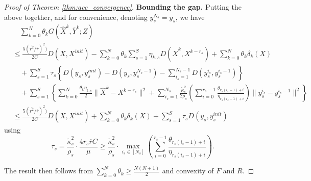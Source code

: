 \documentclass[10pt,a4paper]{amsart}
\begin{document}
\begin{proof}[Proof of Theorem \ref{thm:acc_convergence}]
\textbf{Bounding the gap.}
Putting the above together, and for convenience, denoting $y_s^{N_s} = y_s$, we have
\begin{align*}
    &\quad \sum_{k=0}^N \theta_kG(\widehat{X}^k,\overline{Y}^k;Z)\\
     &\leq \frac{5(\overline{r^2}/\overline{r})^2)}{2C}D(X,X^{init})-\sum_{k=0}^N\theta_k\sum_{s=1}^S  \eta_{k,s} D(\widehat{X}^k,X^{k-r_s})+\sum_{k=0}^N\theta_k\delta_k(X)\\
     &\quad + \sum_{s=1}^S\tau_s\left\{D(y_s,y_s^{init}) - D(y_s,y_s^{N_s-1})-\sum_{i_s=1}^{N_s-1} D(y^{i_s}_s,y_s^{i_s-1})\right\}\\
     &\quad + \sum_{s=1}^S \left\{\sum_{k=0}^N\frac{\theta_k\eta_{k,s}}{2}\|\widehat{X}^k - X^{k-r_s}\|^2 +\sum_{i_s=1}^{N_s}\frac{\widetilde{\kappa}_s^2}{2\rho_s}(\sum_{i=0}^{r_s-1}\frac{\theta_{r_s(i_s-1)+i}}{\eta_{r_s(i_s-1)+i}})\|y_s^{i_s} - y_s^{i_s-1}\|^2\right\}\\
    &\leq \frac{5(\overline{r^2}/\overline{r})^2)}{2C}D(X,X^{init})+\sum_{k=0}^N\theta_k\delta_k(X)+ \sum_{s=1}^S\tau_{s}D(y_s,y_s^{init}) 
\end{align*}
using 
\begin{displaymath}
    \tau_s = \frac{\widetilde{\kappa}_s^2}{\rho_s}\cdot\frac{4r_s\overline{r}C}{\mu}\geq \frac{\widetilde{\kappa}_s^2}{\rho_s}\cdot \max_{i_s\in [N_s]}(\sum_{i=0}^{r_s-1}\frac{\theta_{r_s(i_s-1)+i}}{\eta_{r_s(i_s-1)+i}}). 
\end{displaymath}

The result then follows from $\sum_{k=0}^N \theta_k\geq \frac{N(N+1)}{2}$ and convexity of $F$ and $R$. 


\end{proof}
\end{document}

